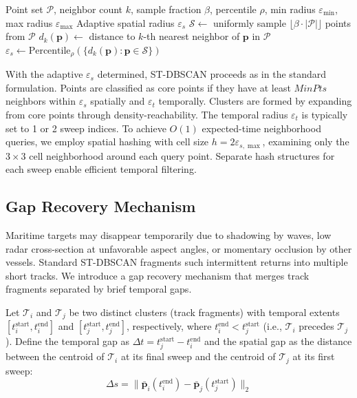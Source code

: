 \documentclass[conf]{new-aiaa}
\begin{document}
\begin{algorithm}[t]
\caption{Adaptive Epsilon via k-NN Statistics}
\label{alg:adaptive_epsilon}
\begin{algorithmic}[1]
\Require Point set $\mathcal{P}$, neighbor count $k$, sample fraction $\beta$, percentile $\rho$, min radius $\varepsilon_{\min}$, max radius $\varepsilon_{\max}$
\Ensure Adaptive spatial radius $\varepsilon_s$
\State $\mathcal{S} \gets$ uniformly sample $\lfloor \beta \cdot |\mathcal{P}| \rfloor$ points from $\mathcal{P}$
    \State $d_k(\mathbf{p}) \gets$ distance to $k$-th nearest neighbor of $\mathbf{p}$ in $\mathcal{P}$
\EndFor
\State $\varepsilon_s \gets \text{Percentile}_{\rho}\left( \{ d_k(\mathbf{p}) : \mathbf{p} \in \mathcal{S} \} \right)$
\State {}
\end{algorithmic}
\end{algorithm}

With the adaptive $\varepsilon_s$ determined, ST-DBSCAN proceeds as in the standard formulation. Points are classified as core points if they have at least $\mathit{MinPts}$ neighbors within $\varepsilon_s$ spatially and $\varepsilon_t$ temporally. Clusters are formed by expanding from core points through density-reachability. The temporal radius $\varepsilon_t$ is typically set to 1 or 2 sweep indices. To achieve $O(1)$ expected-time neighborhood queries, we employ spatial hashing with cell size $h = 2\varepsilon_{s,\max}$, examining only the $3 \times 3$ cell neighborhood around each query point. Separate hash structures for each sweep enable efficient temporal filtering.

\subsection{Gap Recovery Mechanism}

Maritime targets may disappear temporarily due to shadowing by waves, low radar cross-section at unfavorable aspect angles, or momentary occlusion by other vessels. Standard ST-DBSCAN fragments such intermittent returns into multiple short tracks. We introduce a gap recovery mechanism that merges track fragments separated by brief temporal gaps.

Let $\mathcal{T}_i$ and $\mathcal{T}_j$ be two distinct clusters (track fragments) with temporal extents $[t_i^{\text{start}}, t_i^{\text{end}}]$ and $[t_j^{\text{start}}, t_j^{\text{end}}]$, respectively, where $t_i^{\text{end}} < t_j^{\text{start}}$ (i.e., $\mathcal{T}_i$ precedes $\mathcal{T}_j$). Define the temporal gap as $\Delta t = t_j^{\text{start}} - t_i^{\text{end}}$ and the spatial gap as the distance between the centroid of $\mathcal{T}_i$ at its final sweep and the centroid of $\mathcal{T}_j$ at its first sweep:
\begin{equation}
    \Delta s = \| \bar{\mathbf{p}}_i(t_i^{\text{end}}) - \bar{\mathbf{p}}_j(t_j^{\text{start}}) \|_2
\end{equation}
\end{document}
